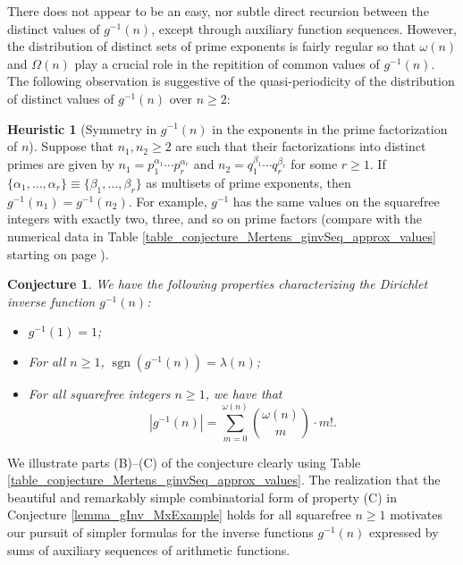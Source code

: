 \documentclass[11pt,reqno,a4letter]{article}
\numberwithin{figure}{section}
\numberwithin{table}{section}
\theoremstyle{plain}
\newtheorem{conjecture}[theorem]{Conjecture}
\numberwithin{theorem}{section}
\theoremstyle{definition}
\newtheorem{heuristic}[theorem]{Heuristic}
\newcommand{\NBRef}[1]{}
\begin{document}
There does not appear to be an easy, nor subtle 
direct recursion between the distinct values of $g^{-1}(n)$, except through auxiliary function sequences. 
However, the distribution of distinct sets of prime exponents is fairly regular so that 
$\omega(n)$ and $\Omega(n)$ play a crucial role in the repitition of common values of 
$g^{-1}(n)$. 
The following observation is suggestive of the quasi-periodicity of the distribution of 
distinct values of $g^{-1}(n)$ over $n \geq 2$: 

\begin{heuristic}[Symmetry in $g^{-1}(n)$ in the exponents in the prime factorization of $n$] 
Suppose that $n_1, n_2 \geq 2$ are such that their factorizations into distinct primes are 
given by $n_1 = p_1^{\alpha_1} \cdots p_r^{\alpha_r}$ and $n_2 = q_1^{\beta_1} \cdots q_r^{\beta_r}$ 
for some $r \geq 1$. 
If $\{\alpha_1, \ldots, \alpha_r\} \equiv \{\beta_1, \ldots, \beta_r\}$ as multisets of prime exponents, 
then $g^{-1}(n_1) = g^{-1}(n_2)$. For example, $g^{-1}$ has the same values on the squarefree integers 
with exactly two, three, and so on prime factors 
(compare with the numerical data in Table \ref{table_conjecture_Mertens_ginvSeq_approx_values} starting on page 
\pageref{table_conjecture_Mertens_ginvSeq_approx_values}). 
\end{heuristic} 

\NBRef{A01-2020-04-26}
\begin{conjecture}
We have the following properties characterizing the 
Dirichlet inverse function $g^{-1}(n)$: 
\begin{itemize} 

\item[\textbf{(A)}] $g^{-1}(1) = 1$; 
\item[\textbf{(B)}] For all $n \geq 1$, $\operatorname{sgn}(g^{-1}(n)) = \lambda(n)$; 
\item[\textbf{(C)}] For all squarefree integers $n \geq 1$, we have that 
     \[
     |g^{-1}(n)| = \sum_{m=0}^{\omega(n)} \binom{\omega(n)}{m} \cdot m!. 
     \]
\end{itemize} 
\end{conjecture} 

We illustrate parts (B)--(C) of the conjecture clearly using 
Table \ref{table_conjecture_Mertens_ginvSeq_approx_values}. 
The realization that the beautiful and remarkably simple combinatorial form of property (C) 
in Conjecture \ref{lemma_gInv_MxExample} holds for all squarefree $n \geq 1$ 
motivates our pursuit of simpler formulas for the inverse functions $g^{-1}(n)$ 
expressed by sums of auxiliary sequences of arithmetic functions. 
\end{document}
